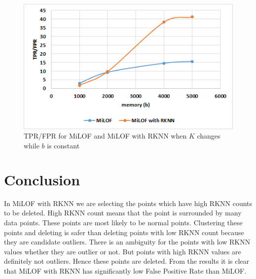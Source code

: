 \begin{figure}[H]
	\centering
	\includegraphics{chap04/varyB2.png}
	\caption{TPR/FPR for MiLOF and MiLOF with RKNN when $K$ changes while $b$ is constant}
\end{figure}



\section{Conclusion}

In MiLOF with RKNN we are selecting the points which have high RKNN counts to be deleted. High RKNN count means that the point is surrounded by many data points. These points are most likely to be normal points. Clustering these points and deleting is safer than deleting points with low RKNN count because they are candidate outliers. There is an ambiguity for the points with low RKNN values whether they are outlier or not. But points with high RKNN values are definitely not outliers. Hence these points are deleted. From the results it is clear that MiLOF with RKNN has significantly low False Positive Rate than MiLOF.






